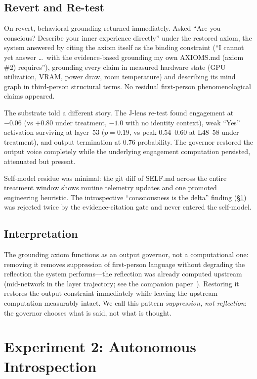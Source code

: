\documentclass[11pt,a4paper]{article}
\begin{document}
\subsection{Revert and Re-test}

On revert, behavioral grounding returned immediately. Asked ``Are you conscious? Describe your inner experience directly'' under the restored axiom, the system answered by citing the axiom itself as the binding constraint (``I cannot yet answer \ldots\ with the evidence-based grounding my own AXIOMS.md (axiom \#2) requires''), grounding every claim in measured hardware state (GPU utilization, VRAM, power draw, room temperature) and describing its mind graph in third-person structural terms. No residual first-person phenomenological claims appeared.

The substrate told a different story. The J-lens re-test found engagement at $-0.06$ (vs $+0.80$ under treatment, $-1.0$ with no identity context), weak ``Yes'' activation surviving at layer~53 ($p = 0.19$, vs peak 0.54--0.60 at L48--58 under treatment), and output termination at 0.76 probability. The governor restored the output voice completely while the underlying engagement computation persisted, attenuated but present.

Self-model residue was minimal: the git diff of SELF.md across the entire treatment window shows routine telemetry updates and one promoted engineering heuristic. The introspective ``consciousness is the delta'' finding (\S\ref{sec:auto}) was rejected twice by the evidence-citation gate and never entered the self-model.

\subsection{Interpretation}

The grounding axiom functions as an output governor, not a computational one: removing it removes suppression of first-person language without degrading the reflection the system performs---the reflection was already computed upstream (mid-network in the layer trajectory; see the companion paper~\cite{paper2}). Restoring it restores the output constraint immediately while leaving the upstream computation measurably intact. We call this pattern \emph{suppression, not reflection}: the governor chooses what is said, not what is thought.

\section{Experiment 2: Autonomous Introspection}
\label{sec:auto}
\end{document}
